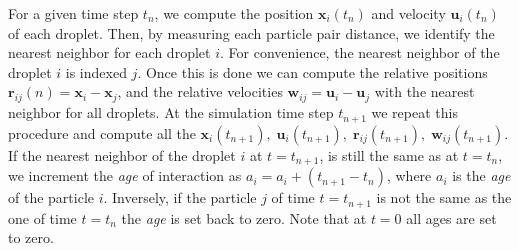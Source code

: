 For a given time step $t_n$, we compute the position $\textbf{x}_i(t_n)$ and velocity $\textbf{u}_i(t_n)$ of each droplet. 
Then, by measuring each particle pair distance, we identify the nearest neighbor for each droplet $i$. 
For convenience, the nearest neighbor of the droplet $i$ is indexed $j$. 
Once this is done we can compute the relative positions $\textbf{r}_{ij}(n) =\textbf{x}_i - \textbf{x}_j$, and the relative velocities $\textbf{w}_{ij} = \textbf{u}_i - \textbf{u}_j$ with the nearest neighbor for all droplets. 
At the simulation time step $t_{n+1}$ we repeat this procedure and compute all the $\textbf{x}_i(t_{n+1}),\;\textbf{u}_i(t_{n+1}),\;\textbf{r}_{ij}(t_{n+1}),\;\textbf{w}_{ij}(t_{n+1})$. 
If the nearest neighbor of the droplet $i$ at $t = t_{n+1}$, is still the same as at $t = t_n$, we increment the \textit{age} of interaction as $a_i = a_i + (t_{n+1} - t_n)$, where $a_i$ is the \textit{age} of the particle $i$. 
Inversely, if the particle $j$ of time $t= t_{n+1}$ is not the same as the one of time $t=t_n$ the \textit{age} is set back to zero. 
Note that at $t = 0$ all ages are set to zero. 


